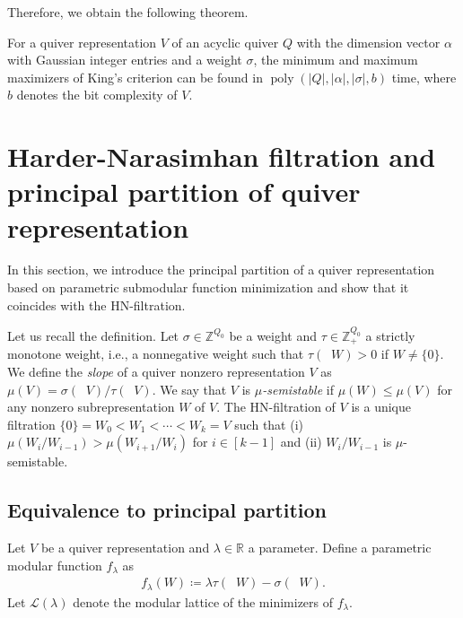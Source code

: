 \documentclass[a4paper,11pt]{article}
\numberwithin{equation}{section}
\newcommand{\R}{\mathbb{R}}
\newcommand{\Z}{\mathbb{Z}}
\newcommand{\caL}{\mathcal{L}}
\DeclareMathOperator{\dimv}{\underline{dim}}
\DeclareMathOperator{\poly}{poly}
\begin{document}
Therefore, we obtain the following theorem.

\begin{theorem}\label{thm:King-maximizer}
    For a quiver representation $V$ of an acyclic quiver $Q$ with the dimension vector $\alpha$ with Gaussian integer entries and a weight $\sigma$, the minimum and maximum maximizers of King's criterion can be found in $\poly(|Q|, |\alpha|, |\sigma|, b)$ time, where $b$ denotes the bit complexity of $V$.
\end{theorem}










\section{Harder-Narasimhan filtration and principal partition of quiver representation}\label{sec:HN}
In this section, we introduce the principal partition of a quiver representation based on parametric submodular function minimization and show that it coincides with the HN-filtration.

Let us recall the definition.
Let $\sigma \in \Z^{Q_0}$ be a weight and $\tau \in \Z_+^{Q_0}$ a strictly monotone weight, i.e., a nonnegative weight such that $\tau(\dimv W) > 0$ if $W \neq \{0\}$.
We define the \emph{slope} of a quiver nonzero representation $V$ as $\mu(V) = \sigma(\dimv V)/\tau(\dimv V)$.
We say that $V$ is \emph{$\mu$-semistable} if $\mu(W) \leq \mu(V)$ for any nonzero subrepresentation $W$ of $V$.
The HN-filtration of $V$ is a unique filtration $\{0\} = W_0 < W_1 < \cdots < W_k = V$ such that (i) $\mu(W_i/W_{i-1}) > \mu(W_{i+1}/ W_i)$ for $i \in [k-1]$ and (ii) $W_i/W_{i-1}$ is $\mu$-semistable.

\subsection{Equivalence to principal partition}
Let $V$ be a quiver representation and $\lambda \in \R$ a parameter.
Define a parametric modular function $f_\lambda$ as
\begin{align}
    f_\lambda(W) \coloneqq \lambda \tau(\dimv W) - \sigma(\dimv W).
\end{align}
Let $\caL(\lambda)$ denote the modular lattice of the minimizers of $f_\lambda$.
\end{document}
